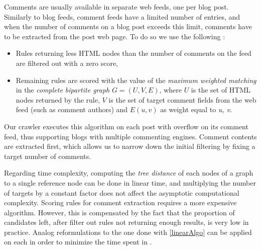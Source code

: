 Comments are usually available in separate web feeds, one per blog post. Similarly to blog feeds, comment feeds have a limited number of entries, and when the number of comments on a blog post exceeds this limit, comments have to be extracted from the post web page. To do so we use the following :
\begin{itemize}
  \item Rules returning less HTML nodes than the number of comments on the feed are filtered out with a zero score,
  \item Remaining rules are scored with the value of the \emph{maximum weighted matching} in the \emph{complete bipartite graph} $G = (U, V, E)$, where $U$ is the set of HTML nodes returned by the rule, $V$ is the set of target comment fields from the web feed (such as comment authors) and $E(u, v)$ as weight equal to \code{(}\emph{u, v}\code{)}.
\end{itemize}
Our crawler executes this algorithm on each post with overflow on its comment feed, thus supporting blogs with multiple commenting engines. Comment contents are extracted first, which allows us to narrow down the initial filtering by fixing a target number of comments.

Regarding time complexity, computing the \emph{tree distance} of each nodes of a graph to a single reference node can be done in linear time, and multiplying the number of targets by a constant factor does not affect the asymptotic computational complexity. Scoring rules for comment extraction requires a more expensive algorithm. However, this is compensated by the fact that the proportion of candidates left, after filter out rules not returning enough results, is very low in practice. Analog reformulations to the one done with \autoref{linearAlgo} can be applied on each  in order to minimize the time spent in .
